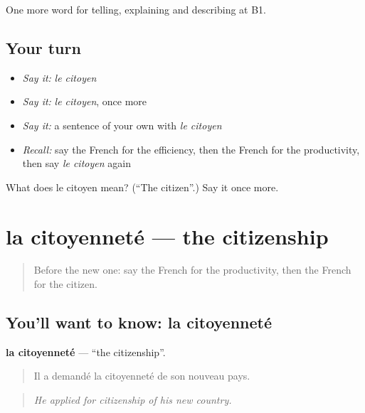 \begin{grammarlens}[title={What you've built}]
One more word for telling, explaining and describing at B1.
\end{grammarlens}

\subsection*{Your turn}
\begin{itemize}
\raggedright
  \item \emph{Say it:} \emph{le citoyen}
  \item \emph{Say it:} \emph{le citoyen}, once more
  \item \emph{Say it:} a sentence of your own with \emph{le citoyen}
  \item \emph{Recall:} say the French for the efficiency, then the French for the productivity, then say \emph{le citoyen} again
\end{itemize}

\begin{tcolorbox}[breakable,colback=teal!4,colframe=teal!35!black,title={Before you move on}]
What does le citoyen mean? (\textquotedblleft{}The citizen\textquotedblright{}.) Say it once more.
\end{tcolorbox}
\section[la citoyenneté]{la citoyenneté — the citizenship}

\label{lesson:FR-C362-citoyennete}



\begin{quote}
Before the new one: say the French for the productivity, then the French for the citizen.
\end{quote}

\subsection*{You'll want to know: la citoyenneté}
\textbf{la citoyenneté} — \textquotedblleft{}the citizenship\textquotedblright{}.

\begin{quote}
Il a demandé la citoyenneté de son nouveau pays.
\end{quote}

\begin{quote}
\emph{He applied for citizenship of his new country.}
\end{quote}

